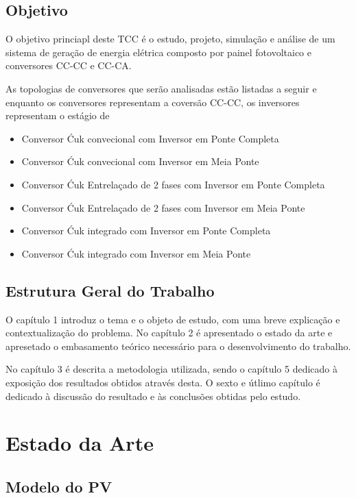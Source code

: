 \documentclass[
	12pt,				%
	openright,			%
	onseside,
	a4paper,			%
	english,			%
	french,				%
	spanish,			%
	brazil,				%
	]{abntex2}
\begin{document}
\section{Objetivo}

O objetivo princiapl deste TCC é o estudo, projeto, simulação e análise de um sistema de geração de energia elétrica composto por painel fotovoltaico e conversores CC-CC e CC-CA. 

As topologias de conversores que serão analisadas estão listadas a seguir e enquanto os conversores representam a coversão CC-CC, os inversores representam o estágio de

\begin{itemize}
	
	\item Conversor Ćuk convecional com Inversor em Ponte Completa
	\item Conversor Ćuk convecional com Inversor em Meia Ponte
	\item Conversor Ćuk Entrelaçado de 2 fases com Inversor em Ponte Completa
	\item Conversor Ćuk Entrelaçado de 2 fases com Inversor em Meia Ponte
	\item Conversor Ćuk integrado com Inversor em Ponte Completa
	\item Conversor Ćuk integrado com Inversor em Meia Ponte
	
\end{itemize}

\section{Estrutura Geral do Trabalho}

O capítulo 1 introduz o tema e o objeto de estudo, com uma breve explicação e contextualização do problema. No capítulo 2 é apresentado o estado da arte e apresetado o embasamento teórico necessário para o desenvolvimento do trabalho.

No capítulo 3 é descrita a metodologia utilizada, sendo o capítulo 5 dedicado à exposição dos resultados obtidos através desta. O sexto e útlimo capítulo é dedicado à discussão do resultado e às conclusões obtidas pelo estudo.

\chapter{Estado da Arte}

\section{Modelo do PV}
\end{document}
